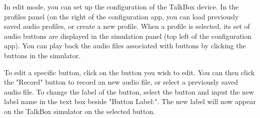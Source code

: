 In edit mode, you can set up the configuration of the TalkBox device. In the profiles panel (on the right of the configuration app, you can load previously saved audio profiles, or create a new profile. When a profile is selected, its set of audio buttons are displayed in the simulation panel (top left of the configuration app). You can play back the audio files associated with buttons by clicking the buttons in the simulator. 

\newline
\medskip
To edit a specific button, click on the button you wish to edit. You can then click the "Record" button to record an new audio file, or select a previously saved audio file. To change the label of the button, select the button and input the new label name in the text box beside "Button Label:". The new label will now appear on the TalkBox simulator on the selected button. 






